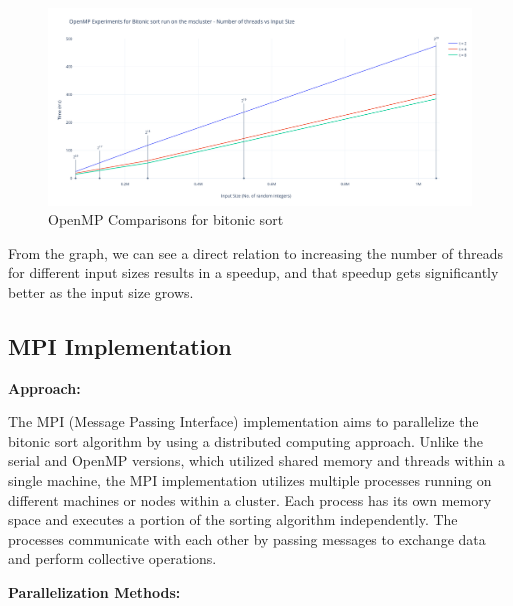 \begin{figure}[htb]
	\centering
	\includegraphics[width=0.8\linewidth]{pics/ompBitonic.png}
    	\caption{OpenMP Comparisons for bitonic sort}\label{fig:ompBitonic}
\end{figure}

From the graph, we can see a direct relation to increasing the number of threads for different input sizes results in a speedup, and that speedup gets significantly better as the input size grows.

\subsection{MPI Implementation}
\textbf{Approach:}

The MPI (Message Passing Interface) implementation aims to parallelize the bitonic sort algorithm by using a distributed computing approach. Unlike the serial and OpenMP versions, which utilized shared memory and threads within a single machine, the MPI implementation utilizes multiple processes running on different machines or nodes within a cluster. Each process has its own memory space and executes a portion of the sorting algorithm independently. The processes communicate with each other by passing messages to exchange data and perform collective operations.

\textbf{Parallelization Methods:}

